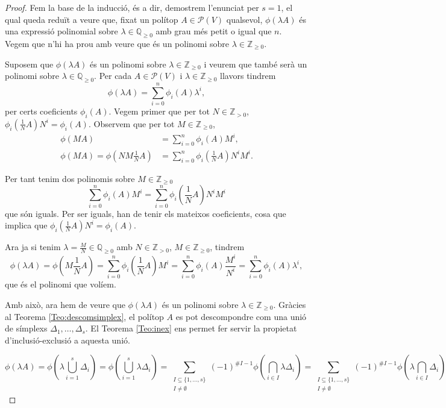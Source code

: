 \documentclass{article}
\theoremstyle{definition}
\begin{document}
\begin{proof}
Fem la base de la inducci\'{o}, \'{e}s a dir, demostrem l'enunciat per $s=1$, el qual queda redu\"{i}t a veure que, fixat un pol\'{i}top $A\in\mathcal{P}(V)$ qualsevol, $\phi(\lambda A)$ \'{e}s una expressi\'{o} polinomial sobre $\lambda\in\mathbb{Q}_{\geq0}$ amb grau m\'{e}s petit o igual que $n$. Vegem que n'hi ha prou amb veure que \'{e}s un polinomi sobre $\lambda\in\mathbb{Z}_{\geq0}$.

Suposem que $\phi(\lambda A)$ \'{e}s un polinomi sobre $\lambda\in\mathbb{Z}_{\geq0}$ i veurem que tamb\'{e} ser\`{a} un polinomi sobre $\lambda\in\mathbb{Q}_{\geq0}$. Per cada $A\in\mathcal{P}(V)$ i $\lambda\in\mathbb{Z}_{\geq0}$ llavors tindrem
\[\phi(\lambda A)=\sum_{i=0}^n\phi_i(A)\lambda^i,\]
per certs coeficients $\phi_i(A)$. Vegem primer que per tot $N\in\mathbb{Z}_{>0}$, $\phi_i(\frac{1}{N}A)N^i=\phi_i(A)$. Observem que per tot $M\in\mathbb{Z}_{\geq0}$,
\begin{align*}
\phi(MA)&=\sum_{i=0}^n\phi_i(A)M^i,\\
\phi(MA)=\phi\left(NM\frac{1}{N}A\right)&=\sum_{i=0}^n\phi_i\left(\frac{1}{N}A\right)N^iM^i.
\end{align*}

Per tant tenim dos polinomis sobre $M\in\mathbb{Z}_{\geq0}$
\[\sum_{i=0}^n\phi_i(A)M^i=\sum_{i=0}^n\phi_i\left(\frac{1}{N}A\right)N^iM^i\]
que s\'{o}n iguals. Per ser iguals, han de tenir els mateixos coeficients, cosa que implica que $\phi_i(\frac{1}{N}A)N^i=\phi_i(A)$.

Ara ja si tenim $\lambda=\frac{M}{N}\in\mathbb{Q}_{\geq0}$ amb $N\in\mathbb{Z}_{>0}$, $M\in\mathbb{Z}_{\geq0}$, tindrem
\[\phi(\lambda A)=\phi\left(M\frac{1}{N}A\right)=\sum_{i=0}^n\phi_i\left(\frac{1}{N}A\right)M^i=\sum_{i=0}^n\phi_i(A)\frac{M^i}{N^i}=\sum_{i=0}^n\phi_i(A)\lambda^i,\]
que \'{e}s el polinomi que vol\'{i}em.

Amb aix\`{o}, ara hem de veure que $\phi(\lambda A)$ \'{e}s un polinomi sobre $\lambda\in\mathbb{Z}_{\geq0}$. Gr\`{a}cies al Teorema \ref{Teo:descomsimplex}, el pol\'{i}top $A$ es pot descompondre com una uni\'{o} de s\'{i}mplexs $\Delta_1,\ldots,\Delta_s$. El Teorema \ref{Teo:inex} ens permet fer servir la propietat d'inclusi\'{o}-exclusi\'{o} a aquesta uni\'{o}.

\[\phi(\lambda A)=\phi\left(\lambda\bigcup_{i=1}^s\Delta_i\right)=\phi\left(\bigcup_{i=1}^s
\lambda\Delta_i\right)=\sum_{\substack{I\subseteq\{1,\ldots,s\}\\I\neq\emptyset}}(-1)^{\#I-1}\phi\left(\bigcap_{i\in I}\lambda\Delta_i\right)=\sum_{\substack{I\subseteq\{1,\ldots,s\}\\I\neq\emptyset}}(-1)^{\#I-1}\phi\left(\lambda\bigcap_{i\in I}\Delta_i\right)\]


\end{proof}
\end{document}
